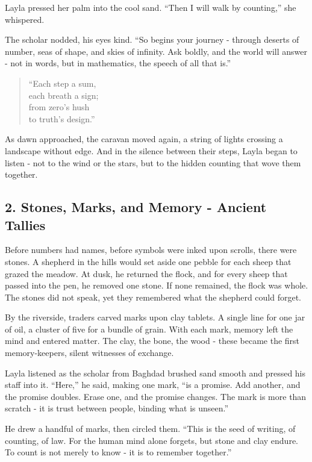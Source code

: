 \documentclass[
  letterpaper,
  DIV=11,
  numbers=noendperiod]{scrreprt}
\begin{document}
Layla pressed her palm into the cool sand. ``Then I will walk by
counting,'' she whispered.

The scholar nodded, his eyes kind. ``So begins your journey - through
deserts of number, seas of shape, and skies of infinity. Ask boldly, and
the world will answer - not in words, but in mathematics, the speech of
all that is.''

\begin{quote}
``Each step a sum,\\
each breath a sign;\\
from zero's hush\\
to truth's design.''
\end{quote}

As dawn approached, the caravan moved again, a string of lights crossing
a landscape without edge. And in the silence between their steps, Layla
began to listen - not to the wind or the stars, but to the hidden
counting that wove them together.

\subsection{2. Stones, Marks, and Memory - Ancient
Tallies}\label{stones-marks-and-memory---ancient-tallies}

Before numbers had names, before symbols were inked upon scrolls, there
were stones. A shepherd in the hills would set aside one pebble for each
sheep that grazed the meadow. At dusk, he returned the flock, and for
every sheep that passed into the pen, he removed one stone. If none
remained, the flock was whole. The stones did not speak, yet they
remembered what the shepherd could forget.

By the riverside, traders carved marks upon clay tablets. A single line
for one jar of oil, a cluster of five for a bundle of grain. With each
mark, memory left the mind and entered matter. The clay, the bone, the
wood - these became the first memory-keepers, silent witnesses of
exchange.

Layla listened as the scholar from Baghdad brushed sand smooth and
pressed his staff into it. ``Here,'' he said, making one mark, ``is a
promise. Add another, and the promise doubles. Erase one, and the
promise changes. The mark is more than scratch - it is trust between
people, binding what is unseen.''

He drew a handful of marks, then circled them. ``This is the seed of
writing, of counting, of law. For the human mind alone forgets, but
stone and clay endure. To count is not merely to know - it is to
remember together.''
\end{document}
